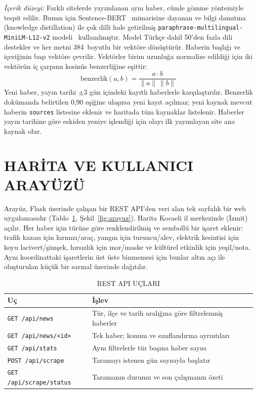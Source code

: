 \documentclass[conference,a4paper]{IEEEtran}
\begin{document}
\emph{İçerik düzeyi:} Farklı sitelerde yayımlanan aynı haber, cümle gömme
yöntemiyle tespit edilir. Bunun için Sentence-BERT~\cite{sbert} mimarisine dayanan
ve bilgi damıtma (knowledge distillation) ile çok dilli hale getirilmiş
\texttt{paraphrase-multilingual-MiniLM-L12-v2} modeli~\cite{multilingual,minilm}
kullanılmıştır. Model Türkçe dahil 50'den fazla dili destekler ve her metni
384~boyutlu bir vektöre dönüştürür. Haberin başlığı ve içeriğinin başı vektöre
çevrilir. Vektörler birim uzunluğa normalize edildiği için iki vektörün iç
çarpımı kosinüs benzerliğine eşittir:
\begin{equation}
\text{benzerlik}(a,b) = \frac{a \cdot b}{\lVert a \rVert\,\lVert b \rVert}
\end{equation}
Yeni haber, yayın tarihi $\pm 3$ gün içindeki kayıtlı haberlerle karşılaştırılır.
Benzerlik dokümanda belirtilen 0,90 eşiğine ulaşırsa yeni kayıt açılmaz; yeni
kaynak mevcut haberin \texttt{sources} listesine eklenir ve haritada tüm
kaynaklar listelenir. Haberler yayın tarihine göre eskiden yeniye işlendiği için
olayı ilk yayımlayan site ana kaynak olur.

\section{HARİTA VE KULLANICI ARAYÜZÜ}\label{sec:arayuz}
Arayüz, Flask üzerinde çalışan bir REST API'den veri alan tek sayfalık bir web
uygulamasıdır (Tablo~\ref{tab:api}, Şekil~\ref{fig:arayuz}). Harita Kocaeli il
merkezinde (İzmit) açılır. Her haber için türüne göre renklendirilmiş ve
sembollü bir işaret eklenir: trafik kazası için kırmızı/araç, yangın için
turuncu/alev, elektrik kesintisi için koyu lacivert/şimşek, hırsızlık için
mor/maske ve kültürel etkinlik için yeşil/nota. Aynı koordinattaki işaretlerin üst
üste binmemesi için bunlar altın açı ile oluşturulan küçük bir sarmal üzerinde
dağıtılır.

\begin{table}[!t]
\caption{REST API UÇLARI}
\label{tab:api}
\centering\footnotesize
\begin{tabular}{@{}p{}p{}@{}}
\toprule
\textbf{Uç} & \textbf{İşlev} \\
\midrule
\texttt{GET /api/news} & Tür, ilçe ve tarih aralığına göre filtrelenmiş haberler \\
\texttt{GET /api/news/<id>} & Tek haber; konum ve sınıflandırma ayrıntıları \\
\texttt{GET /api/stats} & Aynı filtrelerle tür başına haber sayısı \\
\texttt{POST /api/scrape} & Taramayı istenen gün sayısıyla başlatır \\
\texttt{GET /api/scrape/status} & Taramanın durumu ve son çalışmanın özeti \\
\bottomrule
\end{tabular}
\end{table}
\end{document}
